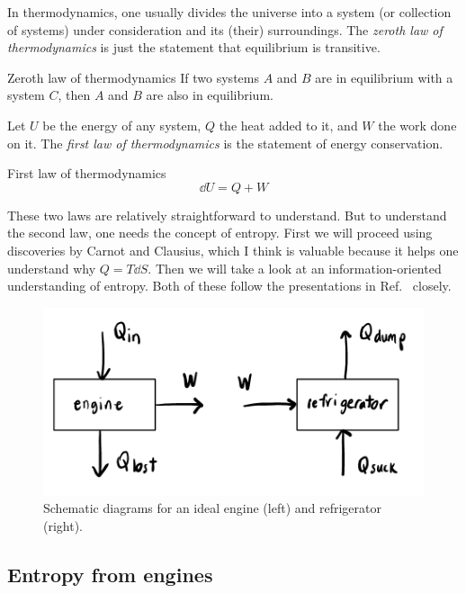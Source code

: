 In thermodynamics, one usually divides the universe into a system 
(or collection of systems) under
consideration and its (their) surroundings.
The {\it zeroth law of thermodynamics} is just the statement that
equilibrium is transitive.
\begin{theorem}{Zeroth law of thermodynamics}{}
  If two systems $A$ and $B$ are in equilibrium with a system $C$, then
$A$ and $B$ are also in equilibrium.
\end{theorem}
Let $U$ be the energy of any system,
$Q$ the heat added to it, and
$W$ the work done on it. The {\it first law of thermodynamics}
is the statement of energy conservation.
\begin{theorem}{First law of thermodynamics}{}
  $$\dd U=Q+W$$
\end{theorem}

These two laws are relatively straightforward to understand. But to understand
the second law, one needs the concept of entropy. First we will proceed
using discoveries by Carnot and Clausius, which I think is valuable
because it helps one understand why $Q=T\dd{S}$. Then we will take a look at an
information-oriented understanding of entropy. Both of these follow the
presentations in Ref.~\cite{kardar_statistical_2007} closely.



\begin{figure}
\includegraphics[width=\linewidth]{figs/engineFrige.pdf}
\caption{Schematic diagrams for an ideal engine (left) and refrigerator (right).}
\label{fig:engineFrige}
\end{figure}



\subsection{Entropy from engines}

